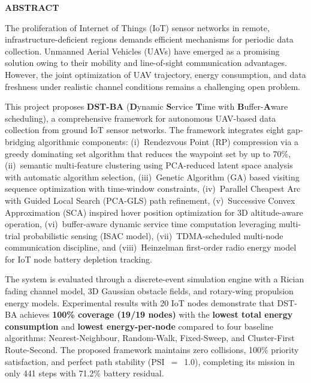 \documentclass[12pt, a4paper, oneside]{report}
\begin{document}
\clearpage
\thispagestyle{plain}
\begin{center}
{\LARGE \textbf{ABSTRACT}}
\end{center}
\vspace{1cm}

The proliferation of Internet of Things (IoT) sensor networks in remote, infrastructure-deficient regions demands efficient mechanisms for periodic data collection. Unmanned Aerial Vehicles (UAVs) have emerged as a promising solution owing to their mobility and line-of-sight communication advantages. However, the joint optimization of UAV trajectory, energy consumption, and data freshness under realistic channel conditions remains a challenging open problem.

\vspace{0.5cm}

This project proposes \textbf{DST-BA} (\textbf{D}ynamic \textbf{S}ervice \textbf{T}ime with \textbf{B}uffer-\textbf{A}ware scheduling), a comprehensive framework for autonomous UAV-based data collection from ground IoT sensor networks. The framework integrates eight gap-bridging algorithmic components: (i)~Rendezvous Point (RP) compression via a greedy dominating set algorithm that reduces the waypoint set by up to 70\%, (ii)~semantic multi-feature clustering using PCA-reduced latent space analysis with automatic algorithm selection, (iii)~Genetic Algorithm (GA) based visiting sequence optimization with time-window constraints, (iv)~Parallel Cheapest Arc with Guided Local Search (PCA-GLS) path refinement, (v)~Successive Convex Approximation (SCA) inspired hover position optimization for 3D altitude-aware operation, (vi)~buffer-aware dynamic service time computation leveraging multi-trial probabilistic sensing (ISAC model), (vii)~TDMA-scheduled multi-node communication discipline, and (viii)~Heinzelman first-order radio energy model for IoT node battery depletion tracking.

\vspace{0.5cm}

The system is evaluated through a discrete-event simulation engine with a Rician fading channel model, 3D Gaussian obstacle fields, and rotary-wing propulsion energy models. Experimental results with 20 IoT nodes demonstrate that DST-BA achieves \textbf{100\% coverage (19/19 nodes)} with the \textbf{lowest total energy consumption} and \textbf{lowest energy-per-node} compared to four baseline algorithms: Nearest-Neighbour, Random-Walk, Fixed-Sweep, and Cluster-First Route-Second. The proposed framework maintains zero collisions, 100\% priority satisfaction, and perfect path stability (PSI~$=$~1.0), completing its mission in only 441 steps with 71.2\% battery residual.
\end{document}
